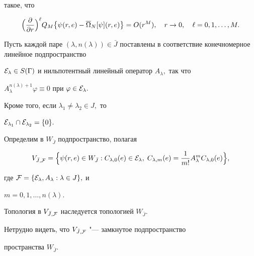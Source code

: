 такое, что

$$\Bigr(\frac{\partial}{\partial r}\Bigl)^{\ell}Q_M\bigl\{

\psi(r,e)-\overline{\Omega}_N[\psi](r,e)\bigr\}=O(r^M),\quad r\to 0,\quad \ell=0, 1, \dots,M.$$



\smallskip

\begin{definition}[2]Пусть каждой паре $(\lambda, n(\lambda)) \in \bar{J}$ поставлены в соответствие конечномерное линейное подпространство

${\cal E}_{\lambda} \in S(\Gamma)$ и нильпотентный линейный оператор $A_{\lambda},$ так что

$A_{\lambda}^{n(\lambda)+1} \varphi \equiv 0$ при $\varphi \in {\cal E}_{\lambda}.$

Кроме того, если $\lambda_1\not= \lambda_2 \in J,$ то

${\cal E}_{\lambda_1} \cap {\cal E}_{\lambda_2} =\{0 \}.$



Определим в $W_{\bar{J}}$ подпространство, полагая 

\begin{equation*}


V_{\bar{J},{\cal F}}=

\Bigl\{\psi(r,e) \in W_{\bar{J}} :  C_{\lambda,0}(e) \in {\cal E}_{\lambda}, \;C_{\lambda,m}(e)=\frac1{m!}A_{\lambda}^mC_{\lambda,0}(e)\Bigr\},

\end{equation*}

где ${\cal F}=\{ {\cal E}_{\lambda},A_{\lambda}: \lambda \in J\},$ и

$m=0, 1, \dots,n(\lambda).$

Топология в $V_{\bar{J},{\cal F}}$ наследуется топологией $W_{\bar{J}}.$

Нетрудно видеть, что $V_{\bar{J},{\cal F}}$ "--- замкнутое подпространство

пространства  $W_{\bar{J}}.$  

\end{definition}



\smallskip













